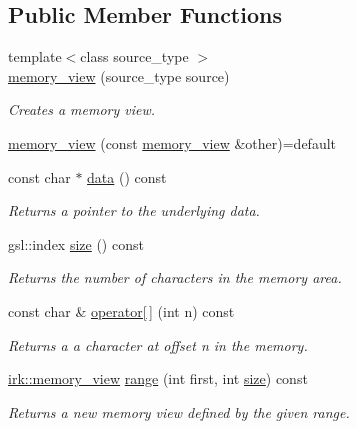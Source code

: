\subsection*{Public Member Functions}
\begin{DoxyCompactItemize}
\item 
{\footnotesize template$<$class source\+\_\+type $>$ }\\\mbox{\hyperlink{classirk_1_1memory__view_a25918933f1b7944199c65654517d2a72}{memory\+\_\+view}} (source\+\_\+type source)
\begin{DoxyCompactList}\small\item\em Creates a memory view. \end{DoxyCompactList}\item 
\mbox{\hyperlink{classirk_1_1memory__view_a10acf8933d8a6e57295c27c73adce179}{memory\+\_\+view}} (const \mbox{\hyperlink{classirk_1_1memory__view}{memory\+\_\+view}} \&other)=default
\item 
const char $\ast$ \mbox{\hyperlink{classirk_1_1memory__view_ab55150c13cf7e380aaaeda8d70d24bed}{data}} () const
\begin{DoxyCompactList}\small\item\em Returns a pointer to the underlying data. \end{DoxyCompactList}\item 
gsl\+::index \mbox{\hyperlink{classirk_1_1memory__view_ac059705d698fc494739ac4245c6ed29f}{size}} () const
\begin{DoxyCompactList}\small\item\em Returns the number of characters in the memory area. \end{DoxyCompactList}\item 
const char \& \mbox{\hyperlink{classirk_1_1memory__view_a944d6187b25fdf17347959362c55a9da}{operator\mbox{[}$\,$\mbox{]}}} (int n) const
\begin{DoxyCompactList}\small\item\em Returns a a character at offset {\ttfamily n} in the memory. \end{DoxyCompactList}\item 
\mbox{\hyperlink{classirk_1_1memory__view}{irk\+::memory\+\_\+view}} \mbox{\hyperlink{classirk_1_1memory__view_ae5f29465eeab2b4b8bdff14139ec138d}{range}} (int first, int \mbox{\hyperlink{classirk_1_1memory__view_ac059705d698fc494739ac4245c6ed29f}{size}}) const
\begin{DoxyCompactList}\small\item\em Returns a new memory view defined by the given range. \end{DoxyCompactList}\item 

\end{DoxyCompactItemize}

